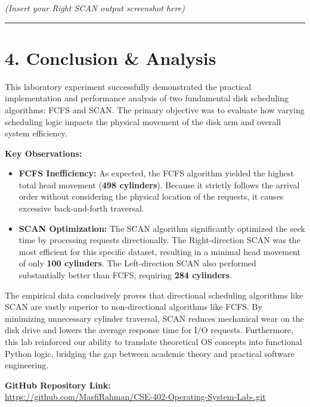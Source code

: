 \documentclass[12pt,a4paper]{article}
\begin{document}
\textit{(Insert your Right SCAN output screenshot here)}

\vspace{0.5cm}
\hrule
\vspace{0.5cm}

\section*{4. Conclusion \& Analysis}

This laboratory experiment successfully demonstrated the practical implementation and performance analysis of two fundamental disk scheduling algorithms: FCFS and SCAN. The primary objective was to evaluate how varying scheduling logic impacts the physical movement of the disk arm and overall system efficiency.

\textbf{Key Observations:}
\begin{itemize}
    \item \textbf{FCFS Inefficiency:} As expected, the FCFS algorithm yielded the highest total head movement (\textbf{498 cylinders}). Because it strictly follows the arrival order without considering the physical location of the requests, it causes excessive back-and-forth traversal.
    \item \textbf{SCAN Optimization:} The SCAN algorithm significantly optimized the seek time by processing requests directionally. The Right-direction SCAN was the most efficient for this specific dataset, resulting in a minimal head movement of only \textbf{100 cylinders}. The Left-direction SCAN also performed substantially better than FCFS, requiring \textbf{284 cylinders}.
\end{itemize}

The empirical data conclusively proves that directional scheduling algorithms like SCAN are vastly superior to non-directional algorithms like FCFS. By minimizing unnecessary cylinder traversal, SCAN reduces mechanical wear on the disk drive and lowers the average response time for I/O requests. Furthermore, this lab reinforced our ability to translate theoretical OS concepts into functional Python logic, bridging the gap between academic theory and practical software engineering.

\vspace{0.5cm}
\textbf{GitHub Repository Link:} \\
\href{https://github.com/MasfiRahman/CSE-402-Operating-System-Lab-.git}{https://github.com/MasfiRahman/CSE-402-Operating-System-Lab-.git}
\end{document}
